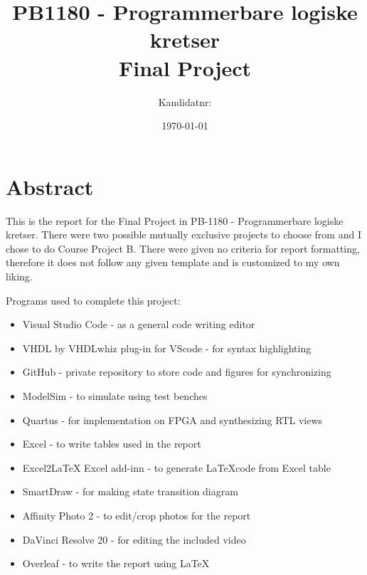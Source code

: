 \documentclass{article}
\title{\fontsize{24}{36}\selectfont PB1180 - Programmerbare logiske kretser\\ %
Final Project} %
\author{{\Large\normalfont Kandidatnr:}\\
{\Large\ttfamily 8022}} %
\date{\today} %
\begin{document}
\maketitle %


\section{Abstract} %
This is the report for the Final Project in PB-1180 - Programmerbare logiske kretser. There were two possible mutually exclusive projects to choose from and I chose to do Course Project B. There were given no criteria for report formatting, therefore it does not follow any given template and is customized to my own liking. \par
Programs used to complete this project:
\begin{itemize}
    \item Visual Studio Code - as a general code writing editor 
    \item VHDL by VHDLwhiz plug-in for VScode - for syntax highlighting
    \item GitHub - private repository to store code and figures for synchronizing
    \item ModelSim - to simulate using test benches 
    \item Quartus - for implementation on FPGA and synthesizing RTL views 
    \item Excel - to write tables used in the report
    \item Excel2LaTeX Excel add-inn - to generate \LaTeX code from Excel table
    \item SmartDraw - for making state transition diagram
    \item Affinity Photo 2 - to edit/crop photos for the report
    \item DaVinci Resolve 20 - for editing the included video
    \item Overleaf - to write the report using \LaTeX
\end{itemize}
\end{document}
